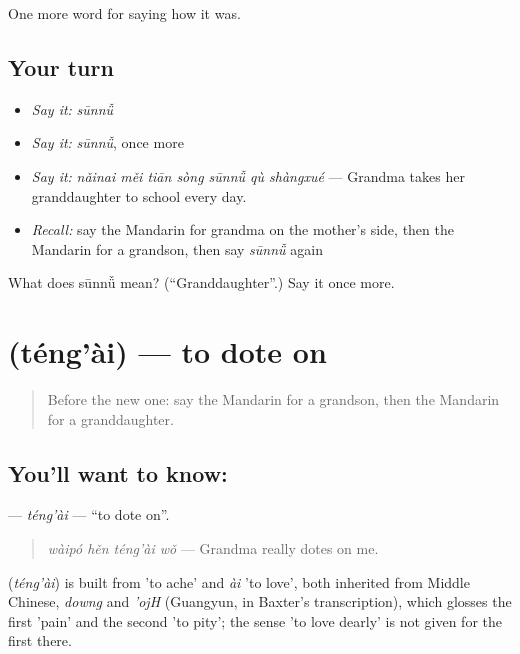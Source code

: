\begin{grammarlens}[title={What you've built}]
One more word for saying how it was.
\end{grammarlens}

\subsection*{Your turn}
\begin{itemize}
\raggedright
  \item \emph{Say it:} \emph{sūnnǚ}
  \item \emph{Say it:} \emph{sūnnǚ}, once more
  \item \emph{Say it:} \emph{nǎinai měi tiān sòng sūnnǚ qù shàngxué} — Grandma takes her granddaughter to school every day.
  \item \emph{Recall:} say the Mandarin for grandma on the mother's side, then the Mandarin for a grandson, then say \emph{sūnnǚ} again
\end{itemize}

\begin{tcolorbox}[breakable,colback=teal!4,colframe=teal!35!black,title={Before you move on}]
What does sūnnǚ mean? (\textquotedblleft{}Granddaughter\textquotedblright{}.) Say it once more.
\end{tcolorbox}
\section[\texorpdfstring{\zh{疼爱} (téng'ài)}{疼爱 (téng'ài)}]{ (téng'ài) — to dote on}

\label{lesson:ZH-C510-tengai}



\begin{quote}
Before the new one: say the Mandarin for a grandson, then the Mandarin for a granddaughter.
\end{quote}

\subsection*{You'll want to know: }
\textbf{} — \emph{téng'ài} — \textquotedblleft{}to dote on\textquotedblright{}.

\begin{quote}
\emph{wàipó hěn téng'ài wǒ} — Grandma really dotes on me.
\end{quote}

\begin{cousinweb}
\textbf{} (\emph{téng'ài}) is built from  'to ache' and \emph{ài} 'to love', both inherited from Middle Chinese, \emph{downg} and \emph{'ojH} (Guangyun, in Baxter's transcription), which glosses the first 'pain' and the second 'to pity'; the sense 'to love dearly' is not given for the first there.
\end{cousinweb}

